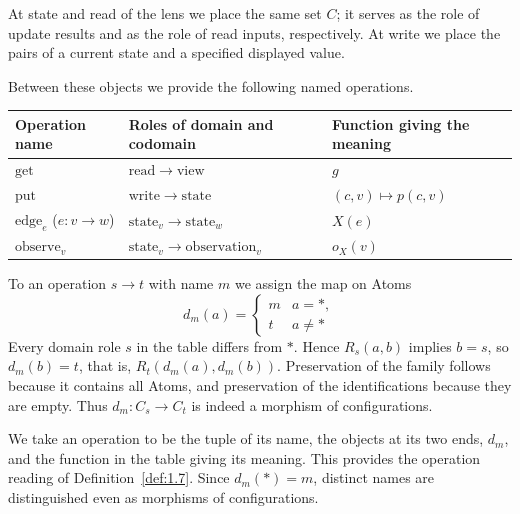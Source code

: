 \begin{construction}
At state and read of the lens we place the same set $C$; it serves as the role
of update results and as the role of read inputs, respectively.
At write we place the pairs of a current state and a specified displayed value.

Between these objects we provide the following named operations.

\begin{xltabular}{\linewidth}{@{}LLL@{}}
\toprule
Operation name & Roles of domain and codomain & Function giving the meaning \\
\midrule
\endhead
$\mathrm{get}$ & $\mathrm{read}\to\mathrm{view}$ & $g$ \\
\addlinespace[3pt]
$\mathrm{put}$ & $\mathrm{write}\to\mathrm{state}$ & $(c,v)\mapsto p(c,v)$ \\
\addlinespace[3pt]
$\mathrm{edge}_e$ ($e:v\to w$) & $\mathrm{state}_v\to\mathrm{state}_w$ & $X(e)$ \\
\addlinespace[3pt]
$\mathrm{observe}_v$ & $\mathrm{state}_v\to\mathrm{observation}_v$ & $o_X(v)$ \\
\bottomrule
\end{xltabular}

To an operation $s\to t$ with name $m$ we assign the map on Atoms
\begin{equation*}
d_m(a)=
\begin{cases}
m & a=*,\\
t & a\ne *
\end{cases}
\tag{1.24}\label{eq:1.24}
\end{equation*}
Every domain role $s$ in the table differs from $*$.
Hence $R_s(a,b)$ implies $b=s$, so $d_m(b)=t$, that is,
$R_t(d_m(a),d_m(b))$.
Preservation of the family follows because it contains all Atoms, and
preservation of the identifications because they are empty.
Thus $d_m:C_s\to C_t$ is indeed a morphism of configurations.

We take an operation to be the tuple of its name, the objects at its two ends,
$d_m$, and the function in the table giving its meaning.
This provides the operation reading of Definition~\ref{def:1.7}.
Since $d_m(*)=m$, distinct names are distinguished even as morphisms of
configurations.

\end{construction}

